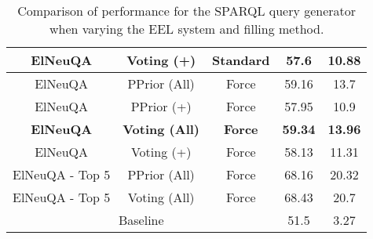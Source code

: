 \begin{table}[h!]
\begin{tabular}{|c|cc|cc|}
    ElNeuQA                          & Voting (+)                                                                                                      & Standard                                                                            & 57.6                                     & 10.88                  \\ \hline
    ElNeuQA                          & PPrior (All)                                                                                                    & Force                                                                               & 59.16                                    & 13.7                   \\
    ElNeuQA                          & PPrior (+)                                                                                                      & Force                                                                               & 57.95                                    & 10.9                   \\
    \textbf{ElNeuQA}                 & \textbf{Voting (All)}                                                                                           & \textbf{Force}                                                                      & \textbf{59.34}                           & \textbf{13.96}         \\
    ElNeuQA                          & Voting (+)                                                                                                      & Force                                                                               & 58.13                                    & 11.31                  \\ \hline
    ElNeuQA - Top 5                  & PPrior (All)                                                                                                    & Force                                                                               & 68.16                                    & 20.32                  \\
    ElNeuQA - Top 5                  & Voting (All)                                                                                                    & Force                                                                               & 68.43                                    & 20.7                   \\ \hline
    \multicolumn{3}{|c|}{Baseline}                                                                                                                                                                                                           & 51.5                                     & 3.27                   \\ \hline
    \end{tabular}%
    \caption{Comparison of performance for the SPARQL query generator when varying the EEL system and filling method.}
    \label{table:queryGenerationResults}
\end{table}

